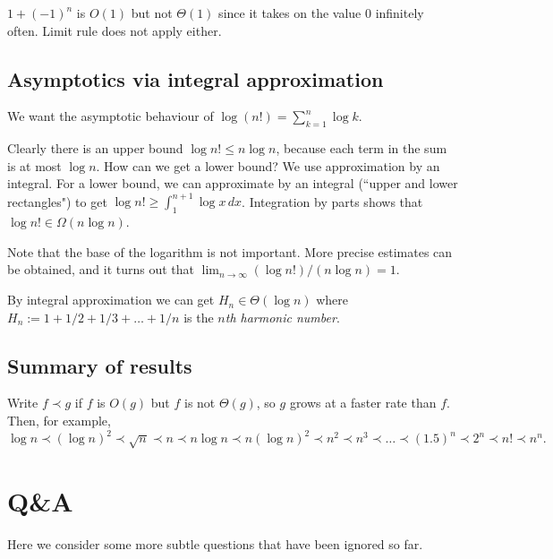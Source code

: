\begin{Boxample}
$1 + (-1)^n$ is $O(1)$ but not $\Theta(1)$ since it takes on the value $0$
 infinitely often. Limit rule does not apply either.
\end{Boxample}
 
\section{Asymptotics via integral approximation}
\begin{Boxample}[8]
We want the asymptotic behaviour of $\log (n!) = \sum_{k=1}^n \log k$.

Clearly there is an upper bound $\log n! \leq n \log n$, because each term in the sum is at most $\log n$. 
How can we get a lower bound? We use approximation by an integral.
For a lower bound, we can approximate by an integral (``upper and lower rectangles") to get 
$\log n! \geq \int_1^{n+1} \log x \, dx$. Integration by parts shows that 
$\log n! \in \Omega(n \log n)$.

\item Note that the base of the logarithm is not important. More precise estimates can 
be obtained, and it turns out that $\lim_{n\to \infty} (\log n!)/(n \log n) = 1$.
\fi
\end{Boxample}

\begin{Boxample} 
By integral approximation we can get $H_n \in \Theta(\log n)$ where 
$H_n:=1+ 1/2 + 1/3 + \dots + 1/n$ is the $n$\emph{th harmonic number}. 
\end{Boxample}

\section{Summary of results}
Write $f \prec g$ if $f$ is $O(g)$ but $f$ is not $\Theta(g)$, so $g$ grows at a
 faster rate than $f$. Then, for example, 
$$
 \log n \prec (\log n)^2 \prec \sqrt{n} \prec n \prec n \log n 
 \prec n (\log n)^2 \prec n^2 
\prec n^3 \prec \dots \prec (1.5)^n \prec 2^n \prec n! \prec n^n.
$$




\chapter{Q\&A} %

Here we consider some more subtle questions that have been ignored so far.

